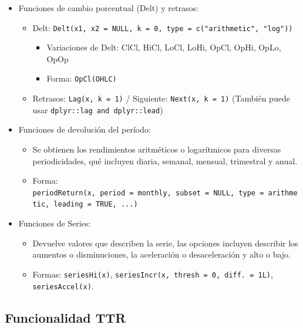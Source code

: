 \documentclass[
]{book}
\providecommand{\tightlist}{%
  \setlength{\itemsep}{0pt}\setlength{\parskip}{0pt}}
\begin{document}
\begin{itemize}
\tightlist
\item
  Funciones de cambio porcentual (Delt) y retrasos:

  \begin{itemize}
  \tightlist
  \item
    Delt: \texttt{Delt(x1,\ x2\ =\ NULL,\ k\ =\ 0,\ type\ =\ c("arithmetic",\ "log"))}

    \begin{itemize}
    \tightlist
    \item
      Variaciones de Delt: ClCl, HiCl, LoCl, LoHi, OpCl, OpHi, OpLo, OpOp
    \item
      Forma: \texttt{OpCl(OHLC)}
    \end{itemize}
  \item
    Retrasos: \texttt{Lag(x,\ k\ =\ 1)} / Siguiente: \texttt{Next(x,\ k\ =\ 1)} (También puede usar \texttt{dplyr::lag\ and\ dplyr::lead})
  \end{itemize}
\item
  Funciones de devolución del período:

  \begin{itemize}
  \tightlist
  \item
    Se obtienen los rendimientos aritméticos o logarítmicos para diversas periodicidades, qué incluyen diaria, semanal, mensual, trimestral y anual.
  \item
    Forma: \texttt{periodReturn(x,\ period\ =\ \textquotesingle{}monthly\textquotesingle{},\ subset\ =\ NULL,\ type\ =\ \textquotesingle{}arithmetic\textquotesingle{},\ leading\ =\ TRUE,\ ...)}
  \end{itemize}
\item
  Funciones de Series:

  \begin{itemize}
  \tightlist
  \item
    Devuelve valores que describen la serie, las opciones incluyen describir los aumentos o disminuciones, la aceleración o desaceleración y alto o bajo.
  \item
    Formas: \texttt{seriesHi(x)}, \texttt{seriesIncr(x,\ thresh\ =\ 0,\ diff.\ =\ 1L)}, \texttt{seriesAccel(x)}.
  \end{itemize}
\end{itemize}

\hypertarget{funcionalidad-ttr}{%
\subsection{Funcionalidad TTR}\label{funcionalidad-ttr}}
\end{document}
